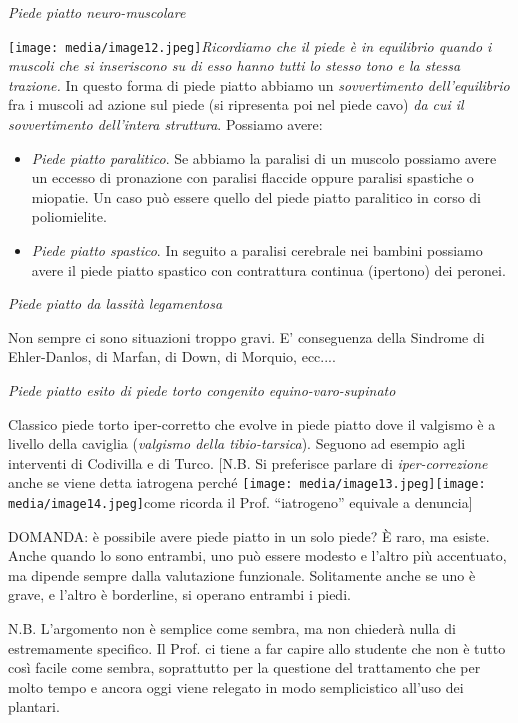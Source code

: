 \documentclass[]{article}
\begin{document}
\emph{Piede piatto neuro-muscolare}

\texttt{[image: media/image12.jpeg]}\emph{Ricordiamo
che il piede è in equilibrio quando i muscoli che si inseriscono su di
esso hanno tutti lo stesso tono e la stessa trazione.} In questo forma
di piede piatto abbiamo un \emph{sovvertimento dell'equilibrio} fra i
muscoli ad azione sul piede (si ripresenta poi nel piede cavo) \emph{da
cui il sovvertimento dell'intera struttura}. Possiamo avere:

\begin{itemize}
\item
  \emph{Piede piatto paralitico}. Se abbiamo la paralisi di un muscolo
  possiamo avere un eccesso di pronazione con paralisi flaccide oppure
  paralisi spastiche o miopatie. Un caso può essere quello del piede
  piatto paralitico in corso di poliomielite.
\item
  \emph{Piede piatto spastico}. In seguito a paralisi cerebrale nei
  bambini possiamo avere il piede piatto spastico con contrattura
  continua (ipertono) dei peronei.
\end{itemize}

\emph{Piede piatto da lassità legamentosa}

Non sempre ci sono situazioni troppo gravi. E' conseguenza della
Sindrome di Ehler-Danlos, di Marfan, di Down, di Morquio, ecc....

\emph{Piede piatto esito di piede torto congenito equino-varo-supinato}

Classico piede torto iper-corretto che evolve in piede piatto dove il
valgismo è a livello della caviglia (\emph{valgismo della
tibio-tarsica}). Seguono ad esempio agli interventi di Codivilla e di
Turco. {[}N.B. Si preferisce parlare di \emph{iper-correzione} anche se
viene detta iatrogena perché
\texttt{[image: media/image13.jpeg]}\texttt{[image: media/image14.jpeg]}come
ricorda il Prof. ``iatrogeno'' equivale a denuncia{]}

DOMANDA: è possibile avere piede piatto in un solo piede? È raro, ma
esiste. Anche quando lo sono entrambi, uno può essere modesto e l'altro
più accentuato, ma dipende sempre dalla valutazione funzionale.
Solitamente anche se uno è grave, e l'altro è borderline, si operano
entrambi i piedi.

N.B. L'argomento non è semplice come sembra, ma non chiederà nulla di
estremamente specifico. Il Prof. ci tiene a far capire allo studente che
non è tutto così facile come sembra, soprattutto per la questione del
trattamento che per molto tempo e ancora oggi viene relegato in modo
semplicistico all'uso dei plantari.
\end{document}

